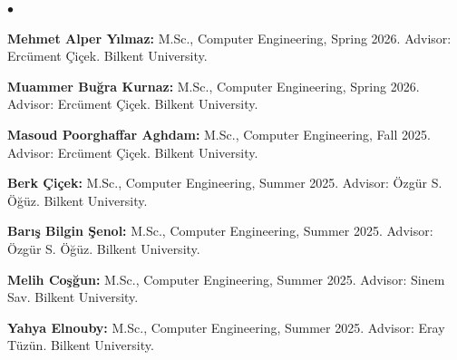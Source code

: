 \documentclass[margin,line]{res}
\newenvironment{list2}{
  \begin{list}{$\bullet$}{%
      \setlength{\itemsep}{0.1cm}
      \setlength{\parsep}{0in} \setlength{\parskip}{0in}
      \setlength{\topsep}{0in} \setlength{\partopsep}{0in} 
      \setlength{\leftmargin}{0.2in}}}{\end{list}}
\begin{document}
\begin{resume}
\begin{list2}
\item
  {\bf Mehmet Alper Yılmaz:} M.Sc., Computer Engineering, Spring 2026.
  Advisor: Ercüment Çiçek.
  Bilkent University.


\item
  {\bf Muammer Buğra Kurnaz:} M.Sc., Computer Engineering, Spring 2026.
  Advisor: Ercüment Çiçek.
  Bilkent University.


\item
  {\bf Masoud Poorghaffar Aghdam:} M.Sc., Computer Engineering, Fall 2025.
  Advisor: Ercüment Çiçek.
  Bilkent University.

\item
  {\bf Berk Çiçek:} M.Sc., Computer Engineering, Summer 2025.
  Advisor: Özgür S. Öğüz.
  Bilkent University.

\item
  {\bf Barış Bilgin Şenol:} M.Sc., Computer Engineering, Summer 2025.
  Advisor: Özgür S. Öğüz.
  Bilkent University.


\item
  {\bf Melih Coşğun:} M.Sc., Computer Engineering, Summer 2025.
  Advisor: Sinem Sav.
  Bilkent University.

\item
  {\bf Yahya Elnouby:} M.Sc., Computer Engineering, Summer 2025.
  Advisor: Eray Tüzün.
  Bilkent University.
\item


\end{list2}
\end{resume}
\end{document}
